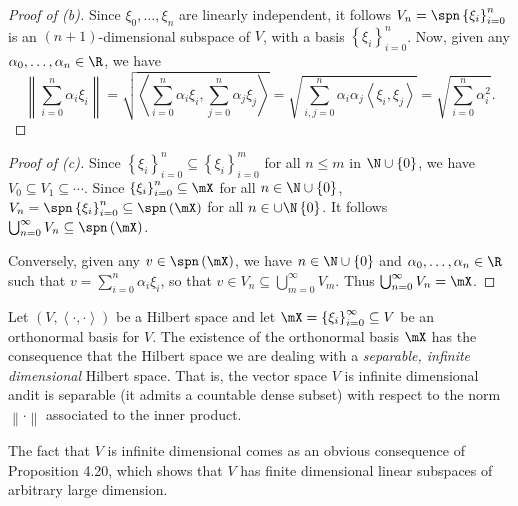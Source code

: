 \documentclass[pmath450]{subfiles}
\begin{document}
    \begin{proof}[Proof of (b)]
        Since $\xi_0,\ldots,\xi_n$ are linearly independent, it follows $V_n = \spn\left\lbrace \xi_i \right\rbrace^{n}_{i=0}$ is an $\left( n+1 \right)$-dimensional subspace of $V$, with a basis $\left\lbrace \xi_i \right\rbrace^{n}_{i=0}$. Now, given any $\alpha_0,\ldots,\alpha_n\in\R$, we have
        \begin{equation*}
            \left\lVert \sum^{n}_{i=0}\alpha_i\xi_i\right\rVert = \sqrt{\left\langle \sum^{n}_{i=0}\alpha_i\xi_i, \sum^{n}_{j=0}\alpha_j\xi_j\right\rangle} = \sqrt{\sum^{n}_{i,j=0}\alpha_i\alpha_j\left\langle \xi_i, \xi_j\right\rangle} = \sqrt{\sum^{n}_{i=0}\alpha_i^{2}}.
        \end{equation*}
        \qedplacedtrue
    \end{proof}

    \begin{proof}[Proof of (c)]
        Since $\left\lbrace \xi_i \right\rbrace^{n}_{i=0}\subseteq\left\lbrace \xi_i \right\rbrace^{m}_{i=0}$ for all $n\leq m$ in $\N\cup\left\lbrace 0 \right\rbrace$, we have $V_0\subseteq V_1\subseteq\cdots$. Since $\left\lbrace \xi_i \right\rbrace^{n}_{i=0}\subseteq\mX$ for all $n\in\N\cup\left\lbrace 0 \right\rbrace$, $V_n=\spn\left\lbrace \xi_i \right\rbrace^{n}_{i=0}\subseteq\spn\left( \mX \right)$ for all $n\in\cup\N\left\lbrace 0 \right\rbrace$. It follows $\bigcup^{\infty}_{n=0} V_n\subseteq\spn\left( \mX \right)$.

        Conversely, given any $v\in\spn\left( \mX \right)$, we have $n\in\N\cup\left\lbrace 0 \right\rbrace$ and $\alpha_0,\ldots,\alpha_n\in\R$ such that $v=\sum^{n}_{i=0}\alpha_i\xi_i$, so that $v\in V_n\subseteq\bigcup^{\infty}_{m=0}V_m$. Thus $\bigcup^{\infty}_{n=0}V_n = \mX$.
    \end{proof}
    
    \np Let $\left( V,\left\langle \cdot, \cdot\right\rangle \right)$ be a Hilbert space and let $\mX = \left\lbrace \xi_i \right\rbrace^{\infty}_{i=0}\subseteq V$ be an orthonormal basis for $V$. The existence of the orthonormal basis $\mX$ has the consequence that the Hilbert space we are dealing with a \textit{separable, infinite dimensional} Hilbert space. That is, the vector space $V$ is infinite dimensional andit is separable (it admits a countable dense subset) with respect to the norm $\left\lVert \cdot\right\rVert$ associated to the inner product.

    The fact that $V$ is infinite dimensional comes as an obvious consequence of Proposition 4.20, which shows that $V$ has finite dimensional linear subspaces of arbitrary large dimension.
\end{document}
